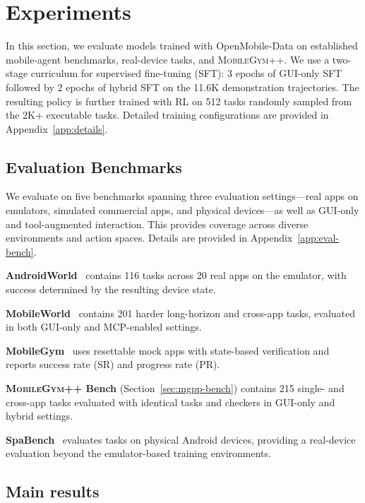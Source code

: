 \section{Experiments}
\label{sec:exp}

In this section, we evaluate models trained with OpenMobile-Data on established mobile-agent benchmarks, real-device tasks, and \textsc{MobileGym++}. We use a two-stage curriculum for supervised fine-tuning (SFT): 3 epochs of GUI-only SFT followed by 2 epochs of hybrid SFT on the 11.6K demonstration trajectories. The resulting policy is further trained with RL on 512 tasks randomly sampled from the 2K+ executable tasks. Detailed training configurations are provided in Appendix~\ref{app:details}.


\subsection{Evaluation Benchmarks}
\label{sec:exp-bench}
We evaluate on five benchmarks spanning three evaluation settings---real apps on emulators, simulated commercial apps, and physical devices---as well as GUI-only and tool-augmented interaction. This provides coverage across diverse environments and action spaces. Details are provided in Appendix~\ref{app:eval-bench}.

\textbf{AndroidWorld}~\citep{rawles2025androidworld} contains 116 tasks across 20 real apps on the emulator, with success determined by the resulting device state.

\textbf{MobileWorld}~\citep{kong2026mobileworld} contains 201 harder long-horizon and cross-app tasks, evaluated in both GUI-only and MCP-enabled settings.

\textbf{MobileGym}~\citep{wu2026mobilegym} uses resettable mock apps with state-based verification and reports success rate (SR) and progress rate (PR).

\textbf{\textsc{MobileGym++} Bench} (Section~\ref{sec:mgpp-bench}) contains 215 single- and cross-app tasks evaluated with identical tasks and checkers in GUI-only and hybrid settings.

\textbf{SpaBench}~\citep{chen2024spa} evaluates tasks on physical Android devices, providing a real-device evaluation beyond the emulator-based training environments.

\subsection{Main results}
\label{sec:exp-main}


